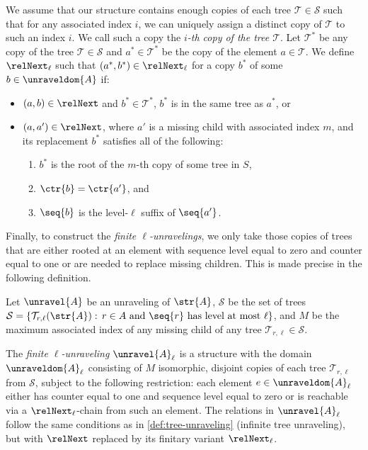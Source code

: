 We assume that our structure contains enough copies of each tree $\mathcal{T} \in \mathcal{S}$ such that for any associated index $i$, we can uniquely assign a distinct copy of $\mathcal{T}$ to such an index $i$.
We call such a copy the \emph{$i$-th copy of the tree $\mathcal{T}$}.
Let $\mathcal{T}^{*}$ be any copy of the tree $\mathcal{T} \in \mathcal{S}$ and $a^{*} \in \mathcal{T}^{*}$ be the copy of the element $a \in \mathcal{T}$.
We define $\relNext_{\ell}$ such that $(a^{*}, b^{*}) \in \relNext_{\ell}$ for a copy $b^{*}$ of some $b \in \unraveldom{A}$ if:
  \begin{itemize}
    \item $(a,b) \in \relNext$ and $b^{*} \in \mathcal{T}^{*}$, \ie{} $b^{*}$ is in the same tree as $a^{*}$, or
    \item
          $(a,a') \in \relNext$, where $a'$ is a missing child with associated index $m$, and its replacement $b^{*}$ satisfies all of the following:
          \begin{enumerate}
            \item $b^{*}$ is the root of the $m$-th copy of some tree in $S$,
            \item $\ctr{b} = \ctr{a'}$, and
            \item $\seq{b}$ is the level-$\ell$ suffix of $\seq{a'}$.
          \end{enumerate}
  \end{itemize}

Finally, to construct the \emph{finite $\ell$-unravelings}, we only take those copies of trees that are either rooted at an element with sequence level equal to zero and counter equal to one or are needed to replace missing children.
This is made precise in the following definition.
\begin{definition}\label{def:finite-tree-unraveling}
  Let $\unravel{A}$ be an unraveling of $\str{A}$, $\mathcal{S}$ be the set of trees $\mathcal{S} = \left\{ \mathcal{T}_{r,\ell}(\str{A}):\, r \in A \text{ and } \seq{r}\ \text{has level at most $\ell$}\right\}$, and
  $M$ be the maximum associated index of any missing child of any tree $\mathcal{T}_{r,\ell} \in \mathcal{S}$.

  \noindent
  The \emph{finite $\ell$-unraveling} $\unravel{A}_{\ell}$ is a structure with the domain $\unraveldom{A}_{\ell}$ consisting of $M$ isomorphic, disjoint copies of each tree $\mathcal{T}_{r,\ell}$ from $\mathcal{S}$, subject to the following restriction: each element $e \in \unraveldom{A}_{\ell}$ either has counter equal to one and sequence level equal to zero or is reachable via a $\relNext_{\ell}$-chain from such an element.
  The relations in $\unravel{A}_{\ell}$ follow the same conditions as in \cref{def:tree-unraveling} (infinite tree unraveling), but with $\relNext$ replaced by its finitary variant $\relNext_{\ell}$.
\end{definition}

